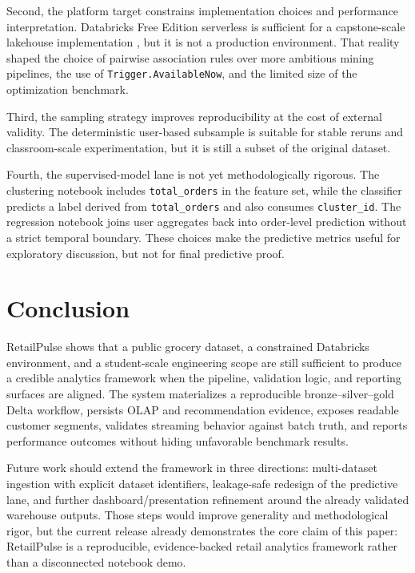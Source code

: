 \documentclass[journal]{IEEEtran}
\begin{document}
Second, the platform target constrains implementation choices and performance interpretation. Databricks Free Edition serverless is sufficient for a capstone-scale lakehouse implementation \cite{databricks_free}, but it is not a production environment. That reality shaped the choice of pairwise association rules over more ambitious mining pipelines, the use of \texttt{Trigger.AvailableNow}, and the limited size of the optimization benchmark.

Third, the sampling strategy improves reproducibility at the cost of external validity. The deterministic user-based subsample is suitable for stable reruns and classroom-scale experimentation, but it is still a subset of the original dataset.

Fourth, the supervised-model lane is not yet methodologically rigorous. The clustering notebook includes \texttt{total\_orders} in the feature set, while the classifier predicts a label derived from \texttt{total\_orders} and also consumes \texttt{cluster\_id}. The regression notebook joins user aggregates back into order-level prediction without a strict temporal boundary. These choices make the predictive metrics useful for exploratory discussion, but not for final predictive proof.

\section{Conclusion}
RetailPulse shows that a public grocery dataset, a constrained Databricks environment, and a student-scale engineering scope are still sufficient to produce a credible analytics framework when the pipeline, validation logic, and reporting surfaces are aligned. The system materializes a reproducible bronze--silver--gold Delta workflow, persists OLAP and recommendation evidence, exposes readable customer segments, validates streaming behavior against batch truth, and reports performance outcomes without hiding unfavorable benchmark results.

Future work should extend the framework in three directions: multi-dataset ingestion with explicit dataset identifiers, leakage-safe redesign of the predictive lane, and further dashboard/presentation refinement around the already validated warehouse outputs. Those steps would improve generality and methodological rigor, but the current release already demonstrates the core claim of this paper: RetailPulse is a reproducible, evidence-backed retail analytics framework rather than a disconnected notebook demo.



\end{document}

